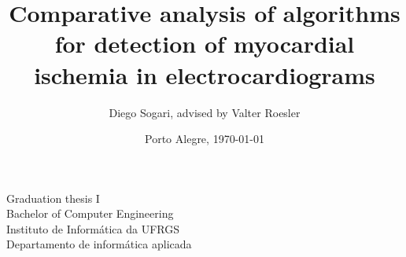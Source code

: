 
\title{Comparative analysis of algorithms for detection of myocardial ischemia in electrocardiograms}
\author{Diego Sogari, advised by Valter Roesler}
\date{Porto Alegre, \today}
\maketitle
\vfill
\begin{flushright}
    Graduation thesis I\\
    Bachelor of Computer Engineering\\
    Instituto de Informática da UFRGS\\
    Departamento de informática aplicada
\end{flushright}
\vfill
\begin{center}
    \ufrgs
\end{center}
\thispagestyle{empty}
